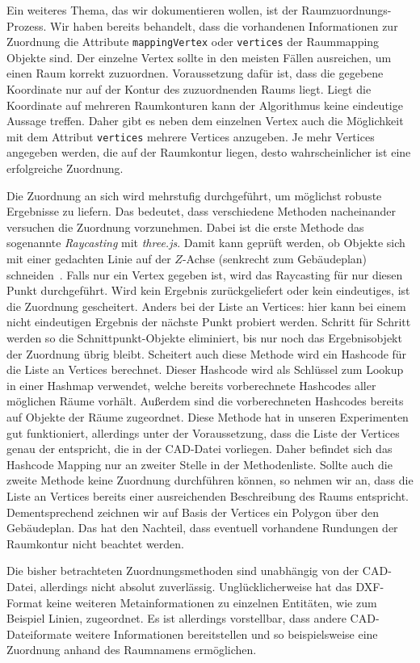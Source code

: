 Ein weiteres Thema, das wir dokumentieren wollen, ist der Raumzuordnungs-Prozess.
Wir haben bereits behandelt, dass die vorhandenen Informationen zur Zuordnung die Attribute \texttt{mappingVertex} oder \texttt{vertices} der Raummapping Objekte sind.
Der einzelne Vertex sollte in den meisten Fällen ausreichen, um einen Raum korrekt zuzuordnen.
Voraussetzung dafür ist, dass die gegebene Koordinate nur auf der Kontur des zuzuordnenden Raums liegt.
Liegt die Koordinate auf mehreren Raumkonturen kann der Algorithmus keine eindeutige Aussage treffen.
Daher gibt es neben dem einzelnen Vertex auch die Möglichkeit mit dem Attribut \texttt{vertices} mehrere Vertices anzugeben.
Je mehr Vertices angegeben werden, die auf der Raumkontur liegen, desto wahrscheinlicher ist eine erfolgreiche Zuordnung.

Die Zuordnung an sich wird mehrstufig durchgeführt, um möglichst robuste Ergebnisse zu liefern.
Das bedeutet, dass verschiedene Methoden nacheinander versuchen die Zuordnung vorzunehmen.
Dabei ist die erste Methode das sogenannte \textit{Raycasting} mit \textit{three.js}.
Damit kann geprüft werden, ob Objekte sich mit einer gedachten Linie auf der \(Z\)-Achse (senkrecht zum Gebäudeplan) schneiden~\cite{Raycaster}.
Falls nur ein Vertex gegeben ist, wird das Raycasting für nur diesen Punkt durchgeführt.
Wird kein Ergebnis zurückgeliefert oder kein eindeutiges, ist die Zuordnung gescheitert.
Anders bei der Liste an Vertices: hier kann bei einem nicht eindeutigen Ergebnis der nächste Punkt probiert werden.
Schritt für Schritt werden so die Schnittpunkt-Objekte eliminiert, bis nur noch das Ergebnisobjekt der Zuordnung übrig bleibt.
Scheitert auch diese Methode wird ein Hashcode für die Liste an Vertices berechnet.
Dieser Hashcode wird als Schlüssel zum Lookup in einer Hashmap verwendet, welche bereits vorberechnete Hashcodes aller möglichen Räume vorhält.
Außerdem sind die vorberechneten Hashcodes bereits auf Objekte der Räume zugeordnet.
Diese Methode hat in unseren Experimenten gut funktioniert, allerdings unter der Voraussetzung, dass die Liste der Vertices genau der entspricht, die in der CAD-Datei vorliegen.
Daher befindet sich das Hashcode Mapping nur an zweiter Stelle in der Methodenliste.
Sollte auch die zweite Methode keine Zuordnung durchführen können, so nehmen wir an, dass die Liste an Vertices bereits einer ausreichenden Beschreibung des Raums entspricht.
Dementsprechend zeichnen wir auf Basis der Vertices ein Polygon über den Gebäudeplan.
Das hat den Nachteil, dass eventuell vorhandene Rundungen der Raumkontur nicht beachtet werden.

Die bisher betrachteten Zuordnungsmethoden sind unabhängig von der CAD-Datei, allerdings nicht absolut zuverlässig.
Unglücklicherweise hat das DXF-Format keine weiteren Metainformationen zu einzelnen \glqq{}Entitäten\grqq{}, wie zum Beispiel Linien, zugeordnet.
Es ist allerdings vorstellbar, dass andere CAD-Dateiformate weitere Informationen bereitstellen und so beispielsweise eine Zuordnung anhand des Raumnamens ermöglichen.
